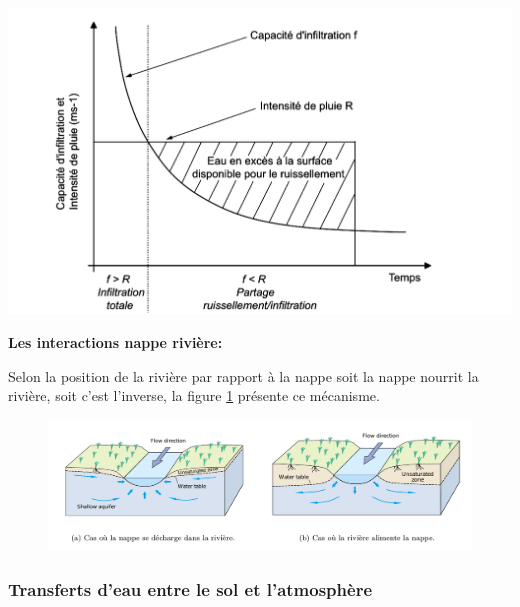 \documentclass[a4paper,11pt]{article}
\numberwithin{equation}{section}
\begin{document}
\begin{center}
	\captionsetup{type=figure}
	\includegraphics[scale=0.2]{ruissellement.png}
\end{center} 

\vspace{0.7cm}

\noindent\textbf{Les interactions nappe rivière:}

Selon la position de la rivière par rapport à la nappe soit la nappe nourrit la rivière, soit c'est l'inverse, la figure \ref{fig:nappe_riviere} présente ce mécanisme.

\begin{figure}[h]
	\begin{center}
		\includegraphics[scale=0.28]{nappe_riviere.png}
	\end{center}
	\label{fig:nappe_riviere}
\end{figure}

\subsubsection{Transferts d'eau entre le sol et l'atmosphère}
\label{ch:mecanismes}
\end{document}
